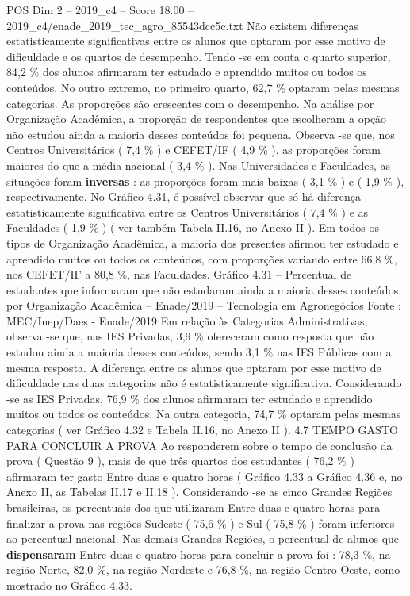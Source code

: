 \begin{textsample}{POS Dim 2 – 2019\_c4 – Score 18.00 – 2019\_c4/enade\_2019\_tec\_agro\_85543dcc5c.txt}
Não existem diferenças estatisticamente significativas entre os alunos que optaram por esse motivo de dificuldade e os quartos de desempenho.
Tendo -se em conta o quarto superior, 84,2 \% dos alunos afirmaram ter estudado e aprendido muitos ou todos os conteúdos.
No outro extremo, no primeiro quarto, 62,7 \% optaram pelas mesmas categorias.
As proporções são crescentes com o desempenho.
Na análise por Organização Acadêmica, a proporção de respondentes que escolheram a opção não estudou ainda a maioria desses conteúdos foi pequena.
Observa -se que, nos Centros Universitários ( 7,4 \% ) e CEFET/IF ( 4,9 \% ), as proporções foram maiores do que a média nacional ( 3,4 \% ).
Nas Universidades e Faculdades, as situações foram \textbf{inversas} : as proporções foram mais baixas ( 3,1 \% ) e ( 1,9 \% ), respectivamente.
No Gráfico 4.31, é possível observar que só há diferença estatisticamente significativa entre os Centros Universitários ( 7,4 \% ) e as Faculdades ( 1,9 \% ) ( ver também Tabela II.16, no Anexo II ).
Em todos os tipos de Organização Acadêmica, a maioria dos presentes afirmou ter estudado e aprendido muitos ou todos os conteúdos, com proporções variando entre 66,8 \%, nos CEFET/IF a 80,8 \%, nas Faculdades.
Gráfico 4.31 – Percentual de estudantes que informaram que não estudaram ainda a maioria desses conteúdos, por Organização Acadêmica – Enade/2019 – Tecnologia em Agronegócios Fonte : MEC/Inep/Daes - Enade/2019 Em relação às Categorias Administrativas, observa -se que, nas IES Privadas, 3,9 \% ofereceram como resposta que não estudou ainda a maioria desses conteúdos, sendo 3,1 \% nas IES Públicas com a mesma resposta.
A diferença entre os alunos que optaram por esse motivo de dificuldade nas duas categorias não é estatisticamente significativa.
Considerando -se as IES Privadas, 76,9 \% dos alunos afirmaram ter estudado e aprendido muitos ou todos os conteúdos.
Na outra categoria, 74,7 \% optaram pelas mesmas categorias ( ver Gráfico 4.32 e Tabela II.16, no Anexo II ). 4.7 TEMPO GASTO PARA CONCLUIR A PROVA Ao responderem sobre o tempo de conclusão da prova ( Questão 9 ), mais de que três quartos dos estudantes ( 76,2 \% ) afirmaram ter gasto Entre duas e quatro horas ( Gráfico 4.33 a Gráfico 4.36 e, no Anexo II, as Tabelas II.17 e II.18 ).
Considerando -se as cinco Grandes Regiões brasileiras, os percentuais dos que utilizaram Entre duas e quatro horas para finalizar a prova nas regiões Sudeste ( 75,6 \% ) e Sul ( 75,8 \% ) foram inferiores ao percentual nacional.
Nas demais Grandes Regiões, o percentual de alunos que \textbf{dispensaram} Entre duas e quatro horas para concluir a prova foi : 78,3 \%, na região Norte, 82,0 \%, na região Nordeste e 76,8 \%, na região Centro-Oeste, como mostrado no Gráfico 4.33.

\end{textsample}
